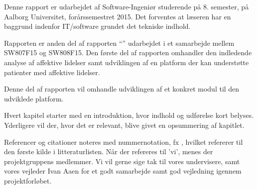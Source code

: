 Denne rapport er udarbejdet af Software-Ingeniør studerende på 8. semester, på Aalborg Universitet, forårssemestret 2015.
Det forventes at læseren har en baggrund indenfor IT/software grundet det tekniske indhold.

Rapporten er anden del af rapporten ``'' udarbejdet i et samarbejde mellem SW807F15 og SW808F15.
Den første del af rapporten omhandler den indledende analyse af affektive lidelser samt udviklingen af en platform der kan understøtte patienter med affektive lidelser.

Denne del af rapporten vil omhandle udviklingen af et konkret modul til den udviklede platform.

Hvert kapitel starter med en introduktion, hvor indhold og udførelse kort belyses.
Yderligere vil der, hvor det er relevant, blive givet en opsummering af kapitlet.

Referencer og citationer noteres med nummernotation, fx \cite{faelles}, hvilket refererer til den første kilde i litteraturlisten.
Når der refereres til 'vi', menes der projektgruppens medlemmer.
\newline
\newline
Vi vil gerne sige tak til vores undervisere, samt vores vejleder Ivan Aaen for et godt samarbejde samt god vejledning igennem projektforløbet.